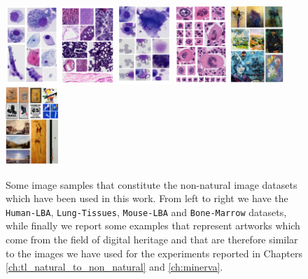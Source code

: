 


\begin{figure}
  \centering
   \includegraphics[width=2cm,height=\textheight,keepaspectratio]{./Images/Chapter06/lba.pdf}%
  \includegraphics[width=2cm,height=\textheight,keepaspectratio]{./Images/Chapter06/tissus.pdf}%
  \includegraphics[width=2cm,height=\textheight,keepaspectratio]{./Images/Chapter06/mouse_lba.pdf}%
    \includegraphics[width=2cm,height=\textheight,keepaspectratio]{./Images/Chapter06/bonemarrow.pdf}%
  \includegraphics[width=2cm,height=\textheight,keepaspectratio]{./Images/Chapter06/artist.pdf}%
  \includegraphics[width=2cm,height=\textheight,keepaspectratio]{./Images/Chapter06/type.pdf}%
  \caption{Some image samples that constitute the non-natural image datasets which have been used in this work. From left to right we have the \texttt{Human-LBA}, \texttt{Lung-Tissues}, \texttt{Mouse-LBA} and \texttt{Bone-Marrow} datasets, while finally we report some examples that represent artworks which come from the field of digital heritage and that are therefore similar to the images we have used for the experiments reported in Chapters \ref{ch:tl_natural_to_non_natural} and \ref{ch:minerva}.}
\label{fig:dataset_images}
\end{figure}

